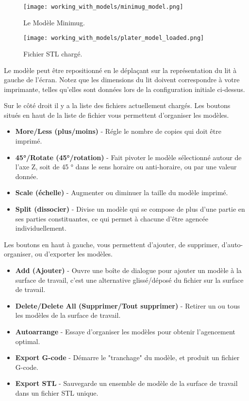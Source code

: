\begin{figure}[H]
\centering
\texttt{[image: working\_with\_models/minimug\_model.png]}
\caption{Le Mod\`ele Minimug.}
\label{fig:minimug_model}
\end{figure}

\begin{figure}[H]
\centering
\texttt{[image: working\_with\_models/plater\_model\_loaded.png]}
\caption{Fichier STL charg\'e.}
\label{fig:plater_model_loaded}
\end{figure}

Le mod\`ele peut \^etre repositionn\'e en le d\'eplaçant sur la repr\'esentation du lit \`a gauche de l'\'ecran. Notez que les dimensions du lit doivent correspondre \`a votre imprimante, telles qu'elles sont donn\'ees lors de la configuration initiale ci-dessus.

Sur le c\^ot\'e droit il y a la liste des fichiers actuellement charg\'es. Les boutons situ\'es en haut de la liste de fichier vous permettent d'organiser les mod\`eles.
\begin{itemize}
	\item \textbf{More/Less (plus/moins)}  - R\'egle le nombre de copies qui doit \^etre imprim\'e.
	\item \textbf{45°/Rotate (45°/rotation)}  - Fait pivoter le mod\`ele s\'electionn\'e autour de l'axe Z, soit de 45 ° dans le sens horaire ou anti-horaire, ou par une valeur donn\'ee.
	\item \textbf{Scale (\'echelle)}  - Augmenter ou diminuer la taille du mod\`ele imprim\'e.
	\item \textbf{Split (dissocier)}  - Divise un mod\`ele qui se compose de plus d'une partie en ses parties constituantes, ce qui permet \`a chacune d'\^etre agenc\'ee individuellement.
\end{itemize}


Les boutons en haut \`a gauche, vous permettent d'ajouter, de supprimer, d'auto-organiser, ou d'exporter les mod\`eles.
\begin{itemize}
	\item \textbf{Add (Ajouter)}  - Ouvre une bo\^ite de dialogue pour ajouter un mod\`ele \`a la surface de travail, c'est une alternative gliss\'e/d\'epos\'e du fichier sur la surface de travail.
	\item \textbf{Delete/Delete All (Supprimer/Tout supprimer)}  - Retirer un ou tous les mod\`eles de la surface de travail.
	\item \textbf{Autoarrange}  - Essaye d'organiser les mod\`eles pour obtenir l'agencement optimal.
	\item \textbf{Export G-code}  - D\'emarre le "tranchage" du mod\`ele, et produit un fichier G-code.
	\item \textbf{Export STL}  - Sauvegarde un ensemble de mod\`ele de la surface de travail dans un fichier STL unique.
\end{itemize}


